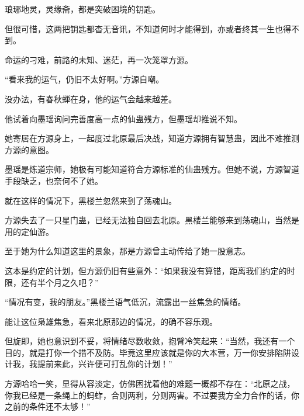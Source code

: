 \begin{this_body}
琅琊地灵，灵缘斋，都是突破困境的钥匙。

但很可惜，这两把钥匙都杳无音讯，不知道何时才能得到，亦或者终其一生也得不到。

命运的刁难，前路的未知、迷茫，再一次笼罩方源。

“看来我的运气，仍旧不太好啊。”方源自嘲。

没办法，有春秋蝉在身，他的运气会越来越差。

他试着向墨瑶询问完善度高一点的仙蛊残方，但墨瑶却推说不知。

她寄居在方源身上，一起度过北原最后决战，知道方源拥有智慧蛊，因此不难推测方源的意图。

墨瑶是炼道宗师，她极有可能知道符合方源标准的仙蛊残方。但她不说，方源智道手段缺乏，也奈何不了她。

就在这样的情况下，黑楼兰忽然来到了荡魂山。

方源失去了一只星门蛊，已经无法独自回去北原。黑楼兰能够来到荡魂山，当然是用的定仙游。

至于她为什么知道这里的景象，那是方源曾主动传给了她一股意志。

这本是约定的计划，但方源仍旧有些意外：“如果我没有算错，距离我们约定的时限，还有半个月之久吧？”

“情况有变，我的朋友。”黑楼兰语气低沉，流露出一丝焦急的情绪。

能让这位枭雄焦急，看来北原那边的情况，的确不容乐观。

但旋即，她也意识到不妥，将情绪尽数收敛，抱臂冷笑起来：“当然，我还有一个目的，就是打你一个措不及防。毕竟这里应该就是你的大本营，万一你安排陷阱设计我，我提前来此，兴许便可打乱你的计划！”

方源哈哈一笑，显得从容淡定，仿佛困扰着他的难题一概都不存在：“北原之战，你我已经是一条绳上的蚂蚱，合则两利，分则两害。不过要我方全力合作的话，你之前的条件还不太够！”

\end{this_body}

